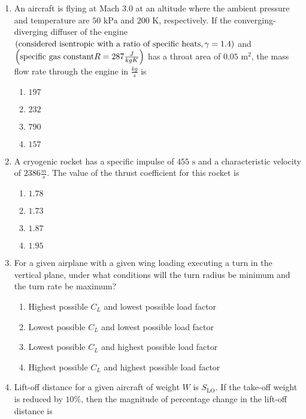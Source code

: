 \documentclass[journal,12pt,twocolumn]{IEEEtran}
\theoremstyle{remark}
\begin{document}
\begin{enumerate}[start=40]
    \item An aircraft is flying at Mach $3.0$ at an altitude where the ambient pressure and temperature are $50 \text{ kPa}$ and $200 \text{ K}$, respectively. If the converging-diverging diffuser of the engine $\left(\text{considered isentropic with a ratio of specific heats}, \gamma = 1.4\right)$ and $\left(\text{specific gas constant} R = 287 \frac{ J}{kg K}\right)$ has a throat area of $0.05 \text{ m}^2$, the mass flow rate through the engine in $\frac{kg}{s}$ is
    \begin{enumerate}
        \item $197$
        \item $232$
        \item $790$
        \item $157$
    \end{enumerate}

    \item A cryogenic rocket has a specific impulse of $455 \text{ s}$ and a characteristic velocity of $2386 \frac{ m}{s}$. The value of the thrust coefficient for this rocket is
    \begin{enumerate}
        \item $1.78$
        \item $1.73$
        \item $1.87$
        \item $1.95$
    \end{enumerate}

    \item For a given airplane with a given wing loading executing a turn in the vertical plane, under what conditions will the turn radius be minimum and the turn rate be maximum?
    \begin{enumerate}
        \item Highest possible $C_L$ and lowest possible load factor
        \item Lowest possible $C_L$ and lowest possible load factor
        \item Lowest possible $C_L$ and highest possible load factor
        \item Highest possible $C_L$ and highest possible load factor
    \end{enumerate}

    \item Lift-off distance for a given aircraft of weight $W$ is $S_{\text{LO}}$. If the take-off weight is reduced by $10\%$, then the magnitude of percentage change in the lift-off distance  is


 






 
\end{enumerate}
\end{document}
